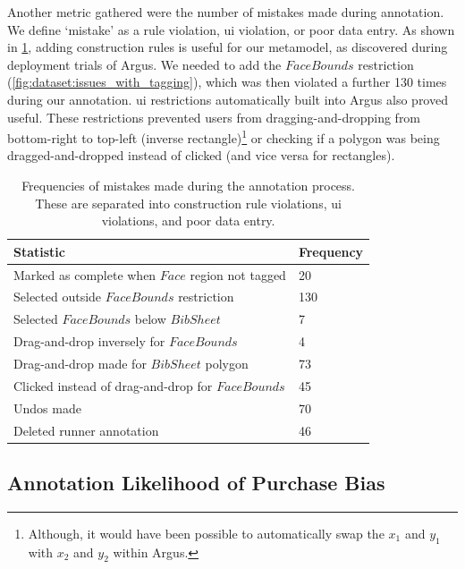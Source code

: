 Another metric gathered were the number of mistakes made during annotation. We define `mistake' as a rule violation, \gls{ui} violation, or poor data entry. As shown in \cref{tab:dataset:argus:metrics:mistakes}, adding construction rules is useful for our metamodel, as discovered during deployment trials of Argus. We needed to add the $FaceBounds$ restriction (\cref{fig:dataset:issues_with_tagging}), which was then violated a further 130 times during our annotation. \gls{ui} restrictions automatically built into Argus also proved useful. These restrictions  prevented users from dragging-and-dropping from bottom-right to top-left (inverse rectangle)\footnote{Although, it would have been possible to automatically swap the $x_{1}$ and $y_{1}$ with $x_{2}$ and $y_{2}$ within Argus.} or checking if a polygon was being dragged-and-dropped instead of clicked (and vice versa for rectangles).

\begin{table}[p]
  \centering
  \caption[Mistakes using Argus]{Frequencies of mistakes made during the annotation process. These are separated into construction rule violations, \gls{ui} violations, and poor data entry.}
  \label{tab:dataset:argus:metrics:mistakes}
  \begin{tabular}{@{}ll@{}}
    \toprule
    \textbf{Statistic}                                & \textbf{Frequency} \\ \midrule
    Marked as complete when $Face$ region not tagged  & 20                 \\
    Selected outside $FaceBounds$ restriction         & 130                \\
    Selected $FaceBounds$ below $BibSheet$            & 7                  \\
    \midrule
    Drag-and-drop inversely for $FaceBounds$          & 4                  \\
    Drag-and-drop made for $BibSheet$ polygon         & 73                 \\
    Clicked instead of drag-and-drop for $FaceBounds$ & 45                 \\
    \midrule
    Undos made                                        & 70                 \\
    Deleted runner annotation                         & 46                 \\ \bottomrule
  \end{tabular}
\end{table}

\subsection{Annotation Likelihood of Purchase Bias}

